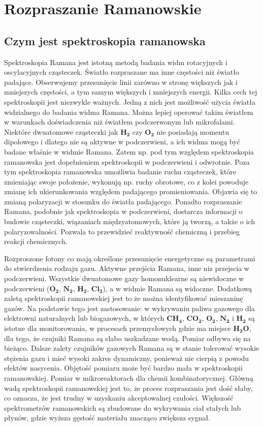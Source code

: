\newpage

\section{Rozpraszanie Ramanowskie}
\subsection{Czym jest spektroskopia ramanowska}
Spektroskopia Ramana jest istotną metodą badania widm rotacyjnych i oscylacyjnych cząsteczek. Światło rozpraszane ma inne częstości niż światło padające. Obserwujemy przesunięcie linii zarówno w stronę większych jak i mniejszych częstości, a tym samym większych i mniejszych energii. Kilka cech tej spektroskopii jest niezwykle ważnych. Jedną z nich jest możliwość użycia światła widzialnego do badania widma Ramana. Można lepiej operować takim światłem w warunkach doświadczenia niż światłem podczerwonym lub mikrofalami. Niektóre dwuatomowe cząsteczki jak $\mathbf{H_{2}}$ czy $\mathbf{O_{2}}$ nie posiadają momentu dipolowego i dlatego nie są aktywne w podczerwieni, a ich widma mogą być badane właśnie w widmie Ramana. Zatem np. pod tym względem spektroskopia ramanowska jest dopełnieniem spektroskopii w podczerwieni i odwrotnie. Poza tym spektroskopia ramanowska umożliwia badanie ruchu cząsteczek, które zmieniając swoje położenie, wykonują np. ruchy obrotowe, co z kolei powoduje zmianę ich ukierunkowania względem padającego promieniowania. Objawia się to zmianą polaryzacji w stosunku do światła padającego. Ponadto rozpraszanie Ramana, podobnie jak spektroskopia w podczerwieni, dostarcza informacji o budowie cząsteczki, wiązaniach międzyatomowych, które ją tworzą, a także o ich polaryzowalności. Pozwala to przewidzieć reaktywność chemiczną i przebieg reakcji chemicznych.

Rozproszone fotony co mają określone przesunięcie energetyczne są parametrami do stwierdzenia rodzaju gazu. Aktywne przejścia Ramana, inne niz przejscia w podczerwieni. Wszystkie dwuatomowe gazy homonuklearne są niewidoczne w podczerwieni ($\mathbf{O_{2}}$, $\mathbf{N_{2}}$, $\mathbf{H_{2}}$, $\mathbf{Cl_{2}}$), a w widmie Ramana są widoczne. Dodatkową zaletą spektroskopii ramanowskiej jest to że można identyfikować mieszaninę gazów. Na podstawie tego jest zastosowanie: w wykrywaniu paliwa gazowego dla elektrowni naturalnych lub biogazowych, w których $\mathbf{CH_{4}}$, $\mathbf{CO_{2}}$, $\mathbf{O_{2}}$, $\mathbf{N_{2}}$ i $\mathbf{H_{2}}$ są istotne dla monitorowania, w procesach przemysłowych gdzie ma miejsce $\mathbf{H_{2}O}$, dla tego, że czujniki Ramana są słabo uszkadzane wodą. Pomiar odbywa się na bieżąco. Dalsze zalety czujników gazowych Ramana są w stanie tolerować wysokie stężenia gazu i mieć wysoki zakres dynamiczny, ponieważ nie cierpią z powodu efektów nasycenia. Objętość pomiaru może być bardzo mała w spektroskopii ramanowskiej. Pomiar w mikroreaktorach dla chemii kombinatorycznej. Główną wadą spektroskopii ramanowskiej jest to, że proces rozpraszania jest dość słaby, co oznacza, że jest trudny w uzyskaniu akceptowalnej czułości. Większość spektrometrów ramanowskich są zbudowane do wykrywania ciał stałych lub płynów, gdzie wyższa gęstość materiału znacząco zwiększa sygnał. 

